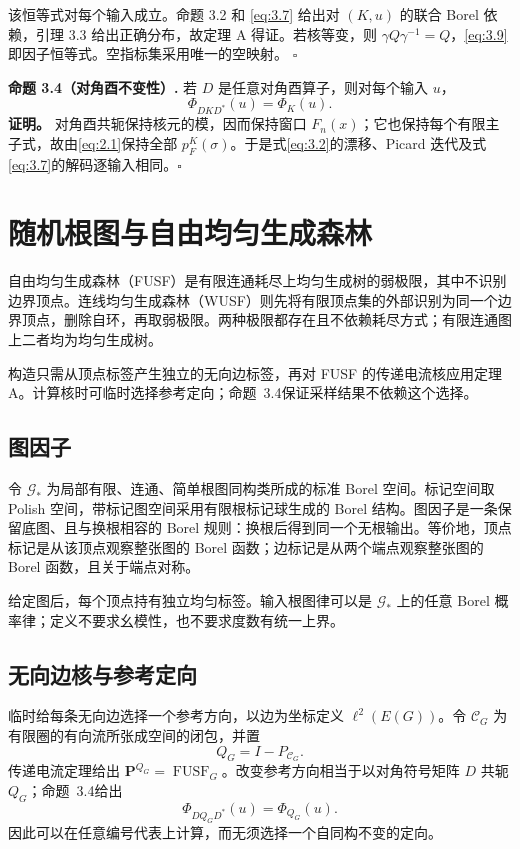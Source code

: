 \documentclass[UTF8,zihao=-4,a4paper]{ctexart}
\numberwithin{equation}{section}
\begin{document}
该恒等式对每个输入成立。命题 3.2 和 \eqref{eq:3.7} 给出对 \((K,u)\) 的联合 Borel 依赖，引理 3.3 给出正确分布，故定理 A 得证。若核等变，则
\(\gamma Q\gamma^{-1}=Q\)，\eqref{eq:3.9} 即因子恒等式。空指标集采用唯一的空映射。 \(\square\)

\textbf{命题 3.4（对角酉不变性）.}\label{prop:gauge}
若 $D$ 是任意对角酉算子，则对每个输入 $u$，
\begin{equation}\label{eq:gauge}
 \Phi_{DKD^*}(u)=\Phi_K(u).
\tag{3.10}
\end{equation}
\textbf{证明。}
对角酉共轭保持核元的模，因而保持窗口 $F_n(x)$；它也保持每个有限主子式，故由\eqref{eq:2.1}保持全部 $p_F^K(\sigma)$。于是式\eqref{eq:3.2}的漂移、Picard 迭代及式\eqref{eq:3.7}的解码逐输入相同。\hfill$\square$

\section{随机根图与自由均匀生成森林}

自由均匀生成森林（FUSF）是有限连通耗尽上均匀生成树的弱极限，其中不识别边界顶点。连线均匀生成森林（WUSF）则先将有限顶点集的外部识别为同一个边界顶点，删除自环，再取弱极限。两种极限都存在且不依赖耗尽方式；有限连通图上二者均为均匀生成树\cite{BLPS}。

构造只需从顶点标签产生独立的无向边标签，再对 FUSF 的传递电流核应用定理 A。计算核时可临时选择参考定向；命题~3.4保证采样结果不依赖这个选择。

\subsection{图因子}

令 $\mathcal G_*$ 为局部有限、连通、简单根图同构类所成的标准 Borel 空间。标记空间取 Polish 空间，带标记图空间采用有限根标记球生成的 Borel 结构。图因子是一条保留底图、且与换根相容的 Borel 规则：换根后得到同一个无根输出。等价地，顶点标记是从该顶点观察整张图的 Borel 函数；边标记是从两个端点观察整张图的 Borel 函数，且关于端点对称\cite[\S2.1]{ARS}。

给定图后，每个顶点持有独立均匀标签。输入根图律可以是 $\mathcal G_*$ 上的任意 Borel 概率律；定义不要求幺模性，也不要求度数有统一上界。

\subsection{无向边核与参考定向}

临时给每条无向边选择一个参考方向，以边为坐标定义 $\ell^2(E(G))$。令 $\mathcal C_G$ 为有限圈的有向流所张成空间的闭包，并置
\begin{equation}\label{eq:4.1}
 Q_G=I-P_{\mathcal C_G}.
\tag{4.1}
\end{equation}
传递电流定理给出 $\mathbf P^{Q_G}=\operatorname{FUSF}_G$\cite[Theorem~7.8]{BLPS}。改变参考方向相当于以对角符号矩阵 $D$ 共轭 $Q_G$；命题~3.4给出
\begin{equation}\label{eq:4.2}
 \Phi_{DQ_GD^*}(u)=\Phi_{Q_G}(u).
\tag{4.2}
\end{equation}
因此可以在任意编号代表上计算，而无须选择一个自同构不变的定向。
\end{document}
